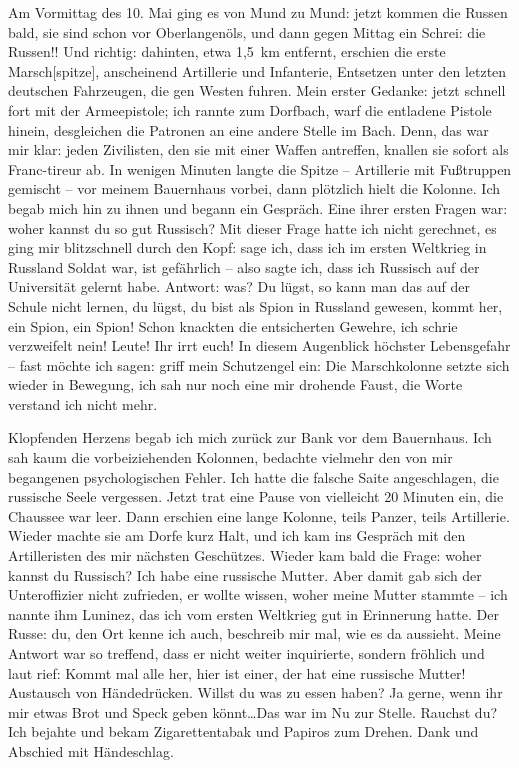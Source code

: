 Am Vormittag des 10. Mai ging es von Mund zu Mund: jetzt kommen die Russen bald, sie sind schon vor Oberlangenöls, und dann gegen Mittag ein Schrei: die Russen!! Und richtig: dahinten, etwa 1,5~km entfernt, erschien die erste Marsch[spitze], anscheinend Artillerie und  Infanterie, Entsetzen unter den letzten deutschen Fahrzeugen, die gen Westen fuhren. Mein erster Gedanke: jetzt schnell fort mit der Armeepistole; ich rannte zum Dorfbach, warf die entladene Pistole hinein, desgleichen die Patronen an eine andere Stelle im Bach. Denn, das war mir klar: jeden Zivilisten, den sie mit einer Waffen antreffen, knallen sie sofort als Franc-tireur ab. In wenigen Minuten langte die Spitze -- Artillerie mit Fußtruppen gemischt -- vor meinem Bauernhaus vorbei, dann plötzlich hielt die Kolonne. Ich begab mich hin zu ihnen und begann ein Gespräch. Eine ihrer ersten Fragen war: woher kannst du so gut Russisch? Mit dieser Frage hatte ich nicht gerechnet, es ging mir blitzschnell durch den Kopf: sage ich, dass ich im ersten Weltkrieg in Russland Soldat war, ist gefährlich -- also sagte ich, dass ich Russisch auf der Universität gelernt habe. Antwort: was? Du lügst, so kann man das auf der Schule nicht lernen, du lügst, du bist als Spion in Russland gewesen, kommt her, ein Spion, ein Spion! Schon knackten die entsicherten Gewehre, ich schrie verzweifelt nein! Leute! Ihr irrt euch! In diesem Augenblick höchster Lebensgefahr -- fast möchte ich sagen: griff mein Schutzengel ein: Die Marschkolonne  setzte sich wieder in Bewegung, ich sah nur noch eine mir drohende Faust, die Worte verstand ich nicht mehr.

Klopfenden Herzens begab ich mich zurück zur Bank vor dem Bauernhaus. Ich sah kaum die vorbeiziehenden Kolonnen, bedachte vielmehr den von mir begangenen psychologischen Fehler. Ich hatte die falsche Saite angeschlagen, die russische Seele vergessen. Jetzt trat eine Pause von vielleicht 20 Minuten ein, die Chaussee war leer. Dann erschien eine lange Kolonne, teils Panzer, teils Artillerie. Wieder machte sie am Dorfe kurz Halt, und ich kam ins Gespräch mit den Artilleristen des mir nächsten Geschützes. Wieder kam bald die Frage: woher kannst du Russisch? Ich habe eine russische Mutter. Aber damit gab sich der Unteroffizier nicht zufrieden, er wollte wissen, woher meine Mutter stammte -- ich nannte ihm Luninez, das ich vom ersten Weltkrieg gut in Erinnerung hatte. Der Russe: du, den Ort kenne ich auch, beschreib mir mal, wie es da aussieht. Meine Antwort war so treffend, dass er nicht weiter inquirierte, sondern fröhlich und laut rief: Kommt mal alle her, hier ist einer, der hat eine russische Mutter! Austausch von Händedrücken. Willst du was  zu essen haben? Ja gerne, wenn ihr mir etwas Brot und Speck geben könnt\dots Das war im Nu zur Stelle. Rauchst du? Ich bejahte und bekam Zigarettentabak und Papiros zum Drehen. Dank und Abschied mit Händeschlag.

